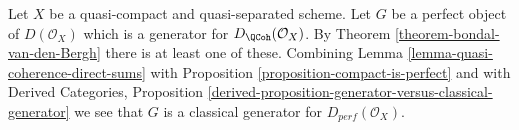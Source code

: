 \begin{remark}
\label{remark-classical-generator}
Let $X$ be a quasi-compact and quasi-separated scheme. Let $G$ be a
perfect object of $D(\mathcal{O}_X)$ which is a generator for
$D_\QCoh(\mathcal{O}_X)$. By Theorem \ref{theorem-bondal-van-den-Bergh}
there is at least one of these. Combining
Lemma \ref{lemma-quasi-coherence-direct-sums} with
Proposition \ref{proposition-compact-is-perfect} and with
Derived Categories, Proposition
\ref{derived-proposition-generator-versus-classical-generator}
we see that $G$ is a classical generator for $D_{perf}(\mathcal{O}_X)$.
\end{remark}
